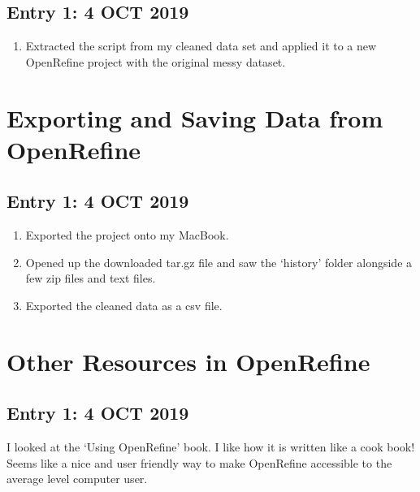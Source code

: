 \documentclass{article}
\begin{document}
\subsection{Entry 1: 4 OCT 2019}

\begin{enumerate}
    \item Extracted the script from my cleaned data set and applied it to a new OpenRefine project with the original messy dataset.
\end{enumerate}

\section{Exporting and Saving Data from OpenRefine}

\subsection{Entry 1: 4 OCT 2019}

\begin{enumerate}
    \item Exported the project onto my MacBook.
    \item Opened up the downloaded tar.gz file and saw the `history' folder alongside a few zip files and text files.
    \item Exported the cleaned data as a csv file.
\end{enumerate}

\section{Other Resources in OpenRefine}

\subsection{Entry 1: 4 OCT 2019}

I looked at the `Using OpenRefine' book. I like how it is written like a cook book! Seems like a nice and user friendly way to make OpenRefine accessible to the average level computer user.
\end{document}
